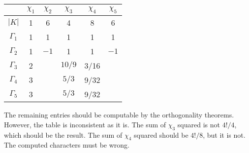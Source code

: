 \documentclass[11pt, english, fleqn, DIV=15, headinclude, BCOR=1cm]{scrartcl}
\begin{document}
\begin{tabular}{c|ccccc}
    & $\chi_1$ & $\chi_2$ & $\chi_3$ & $\chi_4$ & $\chi_5$ \\
    \midrule
    $|K|$ & 1 & 6 & 4 & 8 & 6 \\
    \midrule
    $\Gamma_1$ & 1 & 1 & 1 & 1 & 1 \\
    $\Gamma_2$ & 1 & $-1$ & 1 & 1 & $-1$ \\
    $\Gamma_3$ & 2 & & $10/9$ & 3/16 & \\
    $\Gamma_4$ & 3 & & $5/3$ & 9/32 & \\
    $\Gamma_5$ & 3 & & $5/3$ & 9/32 & \\
\end{tabular}

The remaining entries should be computable by the orthogonality theorems.
However, the table is inconsistent as it is. The sum of $\chi_3$ squared is not
$4!/4$, which should be the result. The sum of $\chi_4$ squared should be
$4!/8$, but it is not. The computed characters must be wrong.
\end{document}
